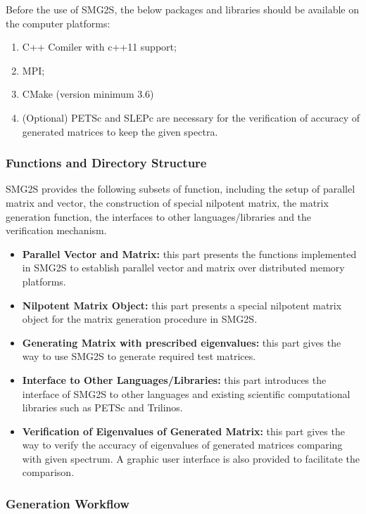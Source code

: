 Before the use of SMG2S, the below packages and libraries should be available on the computer platforms:

\begin{enumerate}
	\item C++ Comiler with c++11 support;
	\item MPI;
	\item CMake (version minimum 3.6)
	\item (Optional) PETSc and SLEPc are necessary for the verification of accuracy of generated matrices to keep the given spectra.
\end{enumerate}

\subsubsection{Functions and Directory Structure}

SMG2S provides the following subsets of function, including the setup of parallel matrix and vector, the construction of special nilpotent matrix, the matrix generation function, the interfaces to other languages/libraries and the verification mechanism.

\begin{itemize}
	\item \textbf{Parallel Vector and Matrix:} this part presents the functions implemented in SMG2S to establish parallel vector and matrix over distributed memory platforms.
	\item \textbf{Nilpotent Matrix Object:} this part presents a special nilpotent matrix object for the matrix generation procedure in SMG2S.
	\item \textbf{Generating Matrix with prescribed eigenvalues:} this part gives the way to use SMG2S to generate required test matrices.
	\item \textbf{Interface to Other Languages/Libraries:} this part introduces the interface of SMG2S to other languages and existing scientific computational libraries such as PETSc and Trilinos.
	\item \textbf{Verification of Eigenvalues of Generated Matrix:} this part gives the way to verify the accuracy of eigenvalues of generated matrices comparing with given spectrum. A graphic user interface is also provided to facilitate the comparison.
\end{itemize}

\subsubsection{Generation Workflow}

